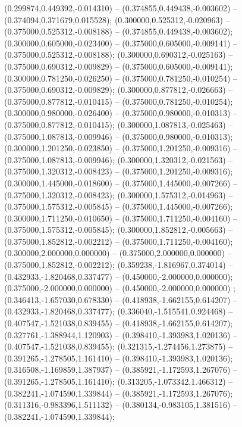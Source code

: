  (0.299874,0.449392,-0.014310) -- (0.374855,0.449438,-0.003602) -- (0.374094,0.371679,0.015528);
 (0.300000,0.525312,-0.020963) -- (0.375000,0.525312,-0.008188) -- (0.374855,0.449438,-0.003602);
 (0.300000,0.605000,-0.023400) -- (0.375000,0.605000,-0.009141) -- (0.375000,0.525312,-0.008188);
 (0.300000,0.690312,-0.025163) -- (0.375000,0.690312,-0.009829) -- (0.375000,0.605000,-0.009141);
 (0.300000,0.781250,-0.026250) -- (0.375000,0.781250,-0.010254) -- (0.375000,0.690312,-0.009829);
 (0.300000,0.877812,-0.026663) -- (0.375000,0.877812,-0.010415) -- (0.375000,0.781250,-0.010254);
 (0.300000,0.980000,-0.026400) -- (0.375000,0.980000,-0.010313) -- (0.375000,0.877812,-0.010415);
 (0.300000,1.087813,-0.025463) -- (0.375000,1.087813,-0.009946) -- (0.375000,0.980000,-0.010313);
 (0.300000,1.201250,-0.023850) -- (0.375000,1.201250,-0.009316) -- (0.375000,1.087813,-0.009946);
 (0.300000,1.320312,-0.021563) -- (0.375000,1.320312,-0.008423) -- (0.375000,1.201250,-0.009316);
 (0.300000,1.445000,-0.018600) -- (0.375000,1.445000,-0.007266) -- (0.375000,1.320312,-0.008423);
 (0.300000,1.575312,-0.014963) -- (0.375000,1.575312,-0.005845) -- (0.375000,1.445000,-0.007266);
 (0.300000,1.711250,-0.010650) -- (0.375000,1.711250,-0.004160) -- (0.375000,1.575312,-0.005845);
 (0.300000,1.852812,-0.005663) -- (0.375000,1.852812,-0.002212) -- (0.375000,1.711250,-0.004160);
 (0.300000,2.000000,0.000000) -- (0.375000,2.000000,0.000000) -- (0.375000,1.852812,-0.002212);
 (0.359238,-1.816967,0.374014) -- (0.432933,-1.820468,0.337477) -- (0.450000,-2.000000,0.000000);
 (0.375000,-2.000000,0.000000) -- (0.450000,-2.000000,0.000000) ;
 (0.346413,-1.657030,0.678330) -- (0.418938,-1.662155,0.614207) -- (0.432933,-1.820468,0.337477);
 (0.336040,-1.515541,0.924468) -- (0.407547,-1.521038,0.839455) -- (0.418938,-1.662155,0.614207);
 (0.327761,-1.388944,1.120903) -- (0.398410,-1.393983,1.020136) -- (0.407547,-1.521038,0.839455);
 (0.321315,-1.274456,1.273875) -- (0.391265,-1.278505,1.161410) -- (0.398410,-1.393983,1.020136);
 (0.316508,-1.169859,1.387937) -- (0.385921,-1.172593,1.267076) -- (0.391265,-1.278505,1.161410);
 (0.313205,-1.073342,1.466312) -- (0.382241,-1.074590,1.339844) -- (0.385921,-1.172593,1.267076);
 (0.311316,-0.983396,1.511132) -- (0.380134,-0.983105,1.381516) -- (0.382241,-1.074590,1.339844);
